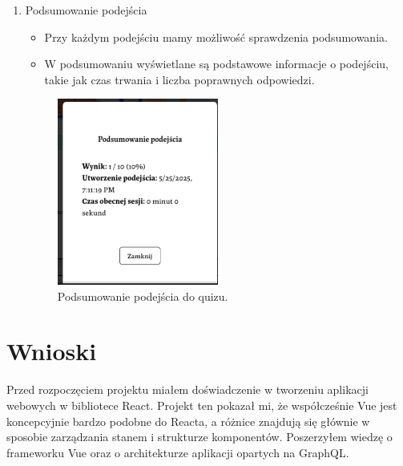\documentclass{article}
\begin{document}
\begin{enumerate}
		\item Podsumowanie podejścia \\
        \begin{minipage}{0.4\textwidth}
          \begin{itemize}
            \item Przy każdym podejściu mamy możliwość sprawdzenia podsumowania.
            \item W podsumowaniu wyświetlane są podstawowe informacje o podejściu, takie jak czas trwania i liczba poprawnych odpowiedzi.
          \end{itemize}
        \end{minipage}
        \begin{minipage}{0.6\textwidth}
          \begin{figure}[H]
            \centering
            \includegraphics[width=0.5\textwidth]{../_assets/web/summary.png}
            \caption{Podsumowanie podejścia do quizu.}
            \label{fig:summary}
          \end{figure}
        \end{minipage}

      \end{enumerate}


    \section{Wnioski}
        Przed rozpoczęciem projektu miałem doświadczenie w tworzeniu aplikacji webowych w bibliotece React.
        Projekt ten pokazał mi, że współcześnie Vue jest koncepcyjnie bardzo podobne do Reacta, a różnice znajdują się głównie w sposobie zarządzania stanem i strukturze komponentów.
        Poszerzyłem wiedzę o frameworku Vue oraz o architekturze aplikacji opartych na GraphQL.
\end{document}
